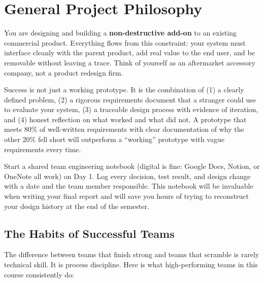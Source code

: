 \section{General Project Philosophy}

\begin{faqbox}
You are designing and building a \textbf{non-destructive add-on} to an existing commercial product. Everything flows from this constraint: your system must interface cleanly with the parent product, add real value to the end user, and be removable without leaving a trace. Think of yourself as an aftermarket accessory company, not a product redesign firm.
\end{faqbox}

\begin{faqbox}
Success is not just a working prototype. It is the combination of (1) a clearly defined problem, (2) a rigorous requirements document that a stranger could use to evaluate your system, (3) a traceable design process with evidence of iteration, and (4) honest reflection on what worked and what did not. A prototype that meets 80\% of well-written requirements with clear documentation of why the other 20\% fell short will outperform a ``working'' prototype with vague requirements every time.
\end{faqbox}

\begin{tipbox}
Start a shared team engineering notebook (digital is fine: Google Docs, Notion, or OneNote all work) on Day 1. Log every decision, test result, and design change with a date and the team member responsible. This notebook will be invaluable when writing your final report and will save you hours of trying to reconstruct your design history at the end of the semester.
\end{tipbox}

\subsection{The Habits of Successful Teams}

The difference between teams that finish strong and teams that scramble is rarely technical skill. It is process discipline. Here is what high-performing teams in this course consistently do:


